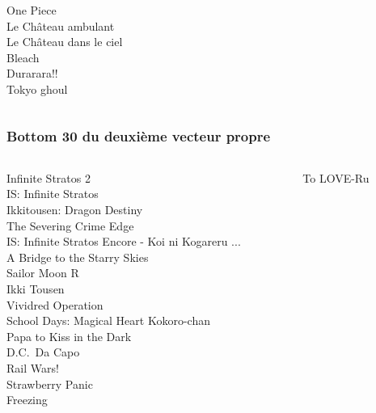 \documentclass[handout]{beamer}
\begin{document}
\begin{frame}
\begin{columns}
\begin{column}{0.5\textwidth}
                                           One Piece\\
                                 Le Château ambulant\\
                             Le Château dans le ciel\\
                                              Bleach\\
                                          Durarara!!\\
                                         Tokyo ghoul\\
    \end{column}
    \end{columns}
\end{frame}

\begin{frame}
    \frametitle{Bottom 30 du deuxième vecteur propre}
    \begin{columns}
    \begin{column}{0.5\textwidth}
                                  Infinite Stratos 2\\
                                IS: Infinite Stratos\\
                          Ikkitousen: Dragon Destiny\\
                             The Severing Crime Edge\\
   IS: Infinite Stratos Encore - Koi ni Kogareru ...\\
                        A Bridge to the Starry Skies\\
                                       Sailor Moon R\\
                                         Ikki Tousen\\
                                  Vividred Operation\\
              School Days: Magical Heart Kokoro-chan\\
                            Papa to Kiss in the Dark\\
                                       D.C.~Da Capo~\\
                                          Rail Wars!\\
                                    Strawberry Panic\\
                                            Freezing\\
    \end{column}
    \begin{column}{0.5\textwidth}
                                          To LOVE-Ru\\

\end{column}
\end{columns}
\end{frame}
\end{document}
